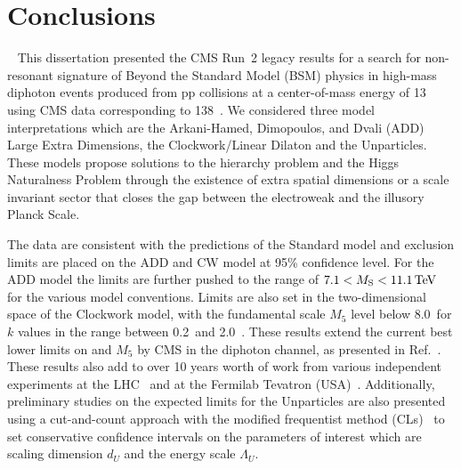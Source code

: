 \chapter{Conclusions}~\label{ch:conclusion}
\RaggedRight \parindent=25pt
This dissertation presented the CMS Run~2 legacy results for a search for non-resonant signature of Beyond the Standard Model (BSM) physics in high-mass diphoton events produced from pp collisions at a center-of-mass energy of 13 \TeV using CMS data corresponding to 138~\fbinv. We considered three model interpretations which are the Arkani-Hamed, Dimopoulos, and Dvali (ADD) Large Extra Dimensions, the Clockwork/Linear Dilaton and the Unparticles. These models propose solutions to the hierarchy problem and the Higgs Naturalness Problem through the existence of extra spatial dimensions or a scale invariant sector that closes the gap between the electroweak and the illusory Planck Scale.

The data are consistent with the predictions of the Standard model and exclusion limits are placed on the ADD and CW model at 95\% confidence level. For the ADD model the limits are further pushed to the range of $7.1 < M_{\rm S} < 11.1\,\text{Te\hspace{-.08em}V}$ for the various model conventions. Limits are also set in the two-dimensional space of the Clockwork model, with the fundamental scale $M_5$ level below 8.0~\TeV for $k$ values in the range between 0.2~\GeV and 2.0~\TeV. These results extend the current best lower limits on \Ms and $M_5$ by CMS in the diphoton channel, as presented in Ref.~\cite{cmsdiphoton2016}. These results also add to over 10 years worth of work from various independent experiments at the LHC~\cite{Sirunyan:2018wnk,Aad:2021,Aaboud:2017yyg,Khachatryan:2016yec,Aaboud:2016tru,Khachatryan:2016hje} and at the Fermilab Tevatron (USA)~\cite{Aaltonen:2011xp,CDF:2002hrr,CDF:2010muc,CDF:2011weq,Abazov:2010xh,D0:2000cve,D0:2008hxb,D0:2005srl}. Additionally, preliminary studies on the expected limits for the Unparticles are also presented using a cut-and-count approach with the modified frequentist method (CLs)~\cite{Cowan:2010js} to set conservative confidence intervals on the parameters of interest which are scaling dimension $d_U$ and the energy scale $\Lambda_{U}$. 



